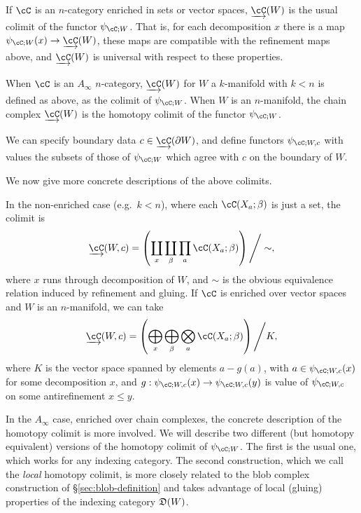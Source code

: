 \begin{defn}
\label{def:colim-fields}
If $\cC$ is an $n$-category enriched in sets or vector spaces, $\cl{\cC}(W)$ is the usual colimit of the functor $\psi_{\cC;W}$.
That is, for each decomposition $x$ there is a map
$\psi_{\cC;W}(x)\to \cl{\cC}(W)$, these maps are compatible with the refinement maps
above, and $\cl{\cC}(W)$ is universal with respect to these properties.
\end{defn}

\begin{defn}
When $\cC$ is an $A_\infty$ $n$-category, $\cl{\cC}(W)$ for $W$ a $k$-manifold with $k < n$ 
is defined as above, as the colimit of $\psi_{\cC;W}$.
When $W$ is an $n$-manifold, the chain complex $\cl{\cC}(W)$ is the homotopy colimit of the functor $\psi_{\cC;W}$.
\end{defn}

We can specify boundary data $c \in \cl{\cC}(\bdy W)$, and define functors $\psi_{\cC;W,c}$ 
with values the subsets of those of $\psi_{\cC;W}$ which agree with $c$ on the boundary of $W$.

We now give more concrete descriptions of the above colimits.

In the non-enriched case (e.g.\ $k<n$), where each $\cC(X_a; \beta)$ is just a set,
the colimit is
\[
	\cl{\cC}(W,c) = \left( \coprod_x \coprod_\beta \prod_a \cC(X_a; \beta) \right) \Bigg/ \sim ,
\]
where $x$ runs through decomposition of $W$, and $\sim$ is the obvious equivalence relation 
induced by refinement and gluing.
If $\cC$ is enriched over vector spaces and $W$ is an $n$-manifold, 
we can take
\begin{equation*}
	\cl{\cC}(W,c) = \left( \bigoplus_x \bigoplus_\beta \bigotimes_a \cC(X_a; \beta) \right) \Bigg/ K,
\end{equation*}
where $K$ is the vector space spanned by elements $a - g(a)$, with
$a\in \psi_{\cC;W,c}(x)$ for some decomposition $x$, and $g: \psi_{\cC;W,c}(x)
\to \psi_{\cC;W,c}(y)$ is value of $\psi_{\cC;W,c}$ on some antirefinement $x \leq y$.

In the $A_\infty$ case, enriched over chain complexes, the concrete description of the homotopy colimit
is more involved.
We will describe two different (but homotopy equivalent) versions of the homotopy colimit of $\psi_{\cC;W}$.
The first is the usual one, which works for any indexing category.
The second construction, which we call the {\it local} homotopy colimit,
is more closely related to the blob complex
construction of \S \ref{sec:blob-definition} and takes advantage of local (gluing) properties
of the indexing category $\mathfrak{D}(W)$.

